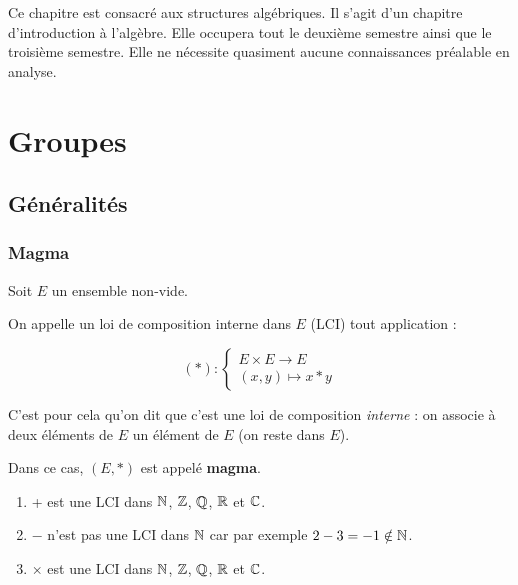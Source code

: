 \documentclass[12pt, a4paper]{report}
\begin{document}

\tableofcontents
\clearpage

\vspace*{\fill}
Ce chapitre est consacré aux structures algébriques. Il s'agit d'un chapitre d'introduction à l'algèbre. Elle occupera tout le deuxième semestre ainsi que le troisième semestre. Elle ne nécessite quasiment aucune connaissances préalable en analyse.
\vspace*{\fill}

\chapter{Groupes}

\section{Généralités}

\subsection{Magma}

\begin{definition}[Magma]
    Soit $E$ un ensemble non-vide.

    On appelle un loi de composition interne dans $E$ (LCI) tout application :

    $$(*):\begin{cases}E\times E\to E\\(x,y)\mapsto x*y\end{cases}$$

    C'est pour cela qu'on dit que c'est une loi de composition \textit{interne} : on associe à deux éléments de $E$ un élément de $E$ (on reste dans $E$).

    Dans ce cas, $(E,*)$ est appelé \textbf{magma}.
\end{definition}

\begin{example}
    \begin{enumerate}
        \item + est une LCI dans $\mathbb{N}$, $\mathbb{Z}$, $\mathbb{Q}$, $\mathbb{R}$ et $\mathbb{C}$.
        \item $-$ n'est pas une LCI dans $\mathbb{N}$ car par exemple $2-3=-1\notin\mathbb{N}$.
        \item $\times$ est une LCI dans $\mathbb{N}$, $\mathbb{Z}$, $\mathbb{Q}$, $\mathbb{R}$ et $\mathbb{C}$.
    \end{enumerate}
\end{example}
\end{document}
